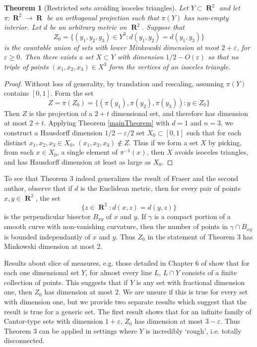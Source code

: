 \documentclass[dvipsnames,letterpaper,12pt]{article}
\numberwithin{equation}{section}
\theoremstyle{plain}
\newtheorem{theorem}{Theorem}
\DeclareMathOperator{\RR}{\mathbf{R}}
\begin{document}
\begin{theorem}[Restricted sets avoiding isoceles triangles]
	Let $Y \subset \RR^2$ and let $\pi: \RR^2 \to \RR$ be an orthogonal projection such that $\pi(Y)$ has non-empty interior. Let $d$ be an arbitrary metric on $\RR^2$. Suppose that
	\[ Z_0 = \{ (y_1, y_2, y_3) \in Y^3: d(y_1,y_2) = d(y_1,y_3) \} \]
	is the countable union of sets with lower Minkowski dimension at most $2 + \varepsilon$, for $\varepsilon \geq 0$. Then there exists a set $X \subset Y$ with dimension $1/2 - O(\varepsilon)$ so that no triple of points $(x_1, x_2, x_3) \in X^3$ form the vertices of an isoceles triangle.
\end{theorem}
\begin{proof}
	Without loss of generality, by translation and rescaling, assuming $\pi(Y)$ contains $[0,1]$. Form the set
	\[ Z = \pi(Z_0) = \{ (\pi(y_1), \pi(y_2), \pi(y_3)) : y \in Z_0 \} \]
	Then $Z$ is the projection of a $2 + t$ dimensional set, and therefore has dimension at most $2 + t$. Applying Theorem \ref{mainTheorem} with $d = 1$ and $n = 3$, we construct a Hausdorff dimension $1/2 - \varepsilon/2$ set $X_0 \subset [0,1]$ such that for each distinct $x_1,x_2,x_3 \in X_0$, $(x_1,x_2,x_3) \not \in Z$. Thus if we form a set $X$ by picking, from each $x \in X_0$, a single element of $\pi^{-1}(x)$, then $X$ avoids isoceles triangles, and has Hausdorff dimension at least as large as $X_0$.
\end{proof}

To see that Theorem 3 indeed generalizes the result of Fraser and the second author, observe that if $d$ is the Euclidean metric, then for every pair of points $x,y \in \RR^2$, the set
%
\[ \{ z \in \RR^2: d(x,z) = d(y,z) \} \]
%
is the perpendicular bisector $B_{xy}$ of $x$ and $y$. If $\gamma$ is a compact portion of a smooth curve with non-vanishing curvature, then the number of points in $\gamma \cap B_{xy}$ is bounded independantly of $x$ and $y$. Thus $Z_0$ in the statement of Theorem 3 has Minkowski dimension at most 2.

Results about slice of measures, e.g. those detailed in Chapter 6 of \cite{Matilla} show that for each one dimensional set $Y$, for almost every line $L$, $L \cap Y$ consists of a finite collection of points. This suggests that if $Y$ is any set with fractional dimension one, then $Z_0$ has dimension at most 2. We are unsure if this is true for every set with dimension one, but we provide two separate results which suggest that the result is true for a generic set. The first result shows that for an infinite family of Cantor-type sets with dimension $1 + \varepsilon$, $Z_0$ has dimension at most $3 - \varepsilon$. Thus Theorem 3 can be applied in settings where $Y$ is incredibly `rough', i.e. totally disconnected.
\end{document}
